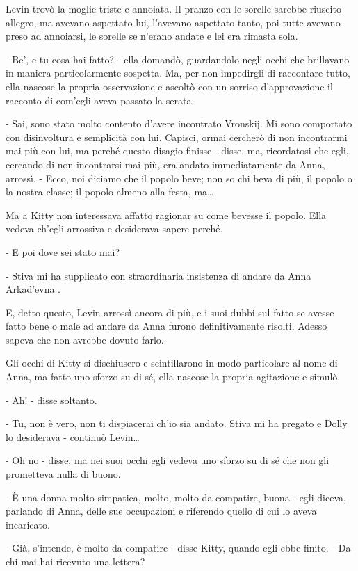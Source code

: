 Levin trovò la moglie triste e annoiata. Il pranzo con le sorelle sarebbe riuscito allegro, ma avevano aspettato lui, l'avevano aspettato tanto, poi tutte avevano preso ad annoiarsi, le sorelle se n'erano andate e lei era rimasta sola. 

- Be', e tu cosa hai fatto? - ella domandò, guardandolo negli occhi che brillavano in maniera particolarmente sospetta. Ma, per non impedirgli di raccontare tutto, ella nascose la propria osservazione e ascoltò con un sorriso d'approvazione il racconto di com'egli aveva passato la serata. 

- Sai, sono stato molto contento d'avere incontrato Vronskij. Mi sono comportato con disinvoltura e semplicità con lui. Capisci, ormai cercherò di non incontrarmi mai più con lui, ma perché questo disagio finisse - disse, ma, ricordatosi che egli, cercando di non incontrarsi mai più, era andato immediatamente da Anna, arrossì. - Ecco, noi diciamo che il popolo beve; non so chi beva di più, il popolo o la nostra classe; il popolo almeno alla festa, ma\ldots{} 

Ma a Kitty non interessava affatto ragionar su come bevesse il popolo. Ella vedeva ch'egli arrossiva e desiderava sapere perché. 

- E poi dove sei stato mai? 

- Stiva mi ha supplicato con straordinaria insistenza di andare da Anna Arkad'evna . 

E, detto questo, Levin arrossì ancora di più, e i suoi dubbi sul fatto se avesse fatto bene o male ad andare da Anna furono definitivamente risolti. Adesso sapeva che non avrebbe dovuto farlo. 

Gli occhi di Kitty si dischiusero e scintillarono in modo particolare al nome di Anna, ma fatto uno sforzo su di sé, ella nascose la propria agitazione e simulò. 

- Ah! - disse soltanto. 

- Tu, non è vero, non ti dispiacerai ch'io sia andato. Stiva mi ha pregato e Dolly lo desiderava - continuò Levin\ldots{} 

- Oh no - disse, ma nei suoi occhi egli vedeva uno sforzo su di sé che non gli prometteva nulla di buono. 

- È una donna molto simpatica, molto, molto da compatire, buona - egli diceva, parlando di Anna, delle sue occupazioni e riferendo quello di cui lo aveva incaricato. 

- Già, s'intende, è molto da compatire - disse Kitty, quando egli ebbe finito. - Da chi mai hai ricevuto una lettera? 

